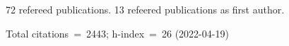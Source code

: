 72 refereed publications. 13 refeered publications as first author.

Total citations~=~2443; h-index~=~26 (2022-04-19)